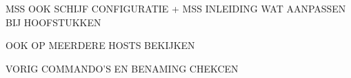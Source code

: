 \chapter{}
\label{ch:basisconf}


MSS OOK SCHIJF CONFIGURATIE + MSS INLEIDING WAT AANPASSEN BIJ HOOFSTUKKEN

OOK OP MEERDERE HOSTS BEKIJKEN

VORIG COMMANDO'S EN BENAMING CHEKCEN